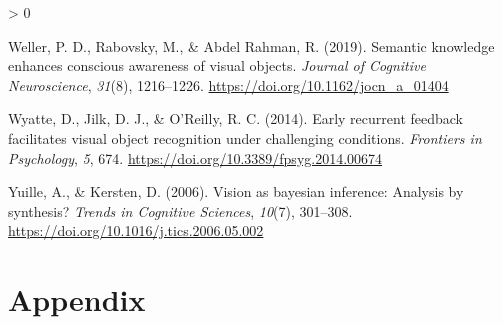 \documentclass[
  english,
  doc,12pt,twoside,floatsintext]{apa7}
\newlength{\cslhangindent}
\newenvironment{CSLReferences}[2] %
 {%
  \setlength{\parindent}{0pt}
  \ifodd #1 \everypar{\setlength{\hangindent}{\cslhangindent}}\ignorespaces\fi
  \ifnum #2 > 0
  \setlength{\parskip}{#2\baselineskip}
  \fi
 }%
 {}
\begin{document}
\begin{CSLReferences}{1}{0}
\leavevmode\hypertarget{ref-weller2019}{}%
Weller, P. D., Rabovsky, M., \& Abdel Rahman, R. (2019). Semantic knowledge enhances conscious awareness of visual objects. \emph{Journal of Cognitive Neuroscience}, \emph{31}(8), 1216--1226. \url{https://doi.org/10.1162/jocn_a_01404}

\leavevmode\hypertarget{ref-wyatte2014}{}%
Wyatte, D., Jilk, D. J., \& O'Reilly, R. C. (2014). Early recurrent feedback facilitates visual object recognition under challenging conditions. \emph{Frontiers in Psychology}, \emph{5}, 674. \url{https://doi.org/10.3389/fpsyg.2014.00674}

\leavevmode\hypertarget{ref-yuille2006}{}%
Yuille, A., \& Kersten, D. (2006). Vision as bayesian inference: Analysis by synthesis? \emph{Trends in Cognitive Sciences}, \emph{10}(7), 301--308. \url{https://doi.org/10.1016/j.tics.2006.05.002}

\end{CSLReferences}

\justify

\newpage

\hypertarget{appendix}{%
\section*{Appendix}\label{appendix}}

\setcounter{table}{0}
\renewcommand{\thetable}{A\arabic{table}}
\end{document}
